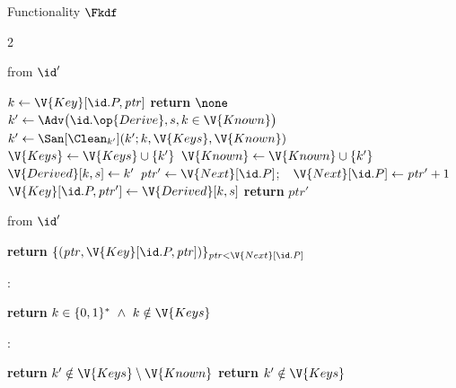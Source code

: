 \begin{interface}[nofloat]{Functionality $\Fkdf$ \\
\params{$\PID$, \quad $\Ps$, \quad $\admits$, \quad
$\uses := \{(\Adv,\serves)\}$, \quad $\pars := \none$}}
{\begin{multicols}{2}
\columnbreak

 \quad from $\id'$
\begin{algorithmic}[1]
\algcont
\State $k \gets \V{Key}[\id.P, \mathit{ptr}]$
  \State \textbf{return} $\none$
\EndIf
{}
  \State $k' \gets \Adv\bigl(\id.\op{Derive}, s, k \in \V{Known}\bigr)$
  \State $k' \gets \San[\Clean_{k'}](k'; k, \V{Keys}, \V{Known})$
  \State $\V{Keys} \gets \V{Keys} \cup \{k'\}$
    \State $\V{Known} \gets \V{Known} \cup \{k'\}$
  \EndIf
  \State $\V{Derived}[k, s] \gets k'$
\EndIf
\State $\mathit{ptr}' \gets \V{Next}[\id.P]$;\ \ $\V{Next}[\id.P] \gets \mathit{ptr}' + 1$
\State $\V{Key}[\id.P, \mathit{ptr}'] \gets \V{Derived}[k, s]$
\State \textbf{return} $\mathit{ptr}'$
\algsave
\end{algorithmic}
\vspace{1.4ex}

 \quad from $\id'$
\begin{algorithmic}[1]
\algcont
\State \textbf{return} $\{(\mathit{ptr}, \V{Key}[\id.P, \mathit{ptr}])\}_{\mathit{ptr} < \V{Next}[\id.P]}$
\algsave
\end{algorithmic}
\vspace{1.4ex}

:
\begin{algorithmic}[1]
\algcont
\State \textbf{return} $k \in \{0,1\}^{*} \ \wedge\ k \notin \V{Keys}$
\algsave
\end{algorithmic}
\vspace{1.4ex}

:
\begin{algorithmic}[1]
\algcont
{}
  \State \textbf{return} $k' \notin \V{Keys} \setminus \V{Known}$
\EndIf
\State \textbf{return} $k' \notin \V{Keys}$
\algsave
\end{algorithmic}
\end{multicols}}
\end{interface}
